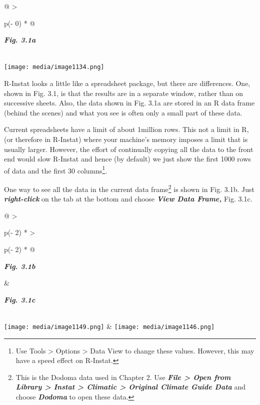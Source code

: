 \documentclass[
  letterpaper,
  DIV=11,
  numbers=noendperiod]{scrreprt}
\begin{document}
\begin{longtable}[]{@{}
  >{\raggedright\arraybackslash}p{(\columnwidth - 0\tabcolsep) * }@{}}
\toprule\noalign{}
\begin{minipage}[b]{\linewidth}\raggedright
\textbf{\emph{Fig. 3.1a}}
\end{minipage} \\
\midrule\noalign{}
\endhead
\bottomrule\noalign{}
\endlastfoot
\texttt{[image: media/image1134.png]} \\
\end{longtable}

R-Instat looks a little like a spreadsheet package, but there are
differences. One, shown in Fig. 3.1, is that the results are in a
separate window, rather than on successive sheets. Also, the data shown
in Fig. 3.1a are stored in an R data frame (behind the scenes) and what
you see is often only a small part of these data.

Current spreadsheets have a limit of about 1million rows. This not a
limit in R, (or therefore in R-Instat) where your machine's memory
imposes a limit that is usually larger. However, the effort of
continually copying all the data to the front end would slow R-Instat
and hence (by default) we just show the first 1000 rows of data and the
first 30 columns\footnote{Use Tools \textgreater{} Options
  \textgreater{} Data View to change these values. However, this may
  have a speed effect on R-Instat.}.

One way to see all the data in the current data frame\footnote{This is
  the Dodoma data used in Chapter 2. Use \textbf{\emph{File
  \textgreater{} Open from Library \textgreater{} Instat \textgreater{}
  Climatic \textgreater{} Original Climate Guide Data}} and choose
  \textbf{\emph{Dodoma}} to open these data.} is shown in Fig. 3.1b.
Just \textbf{\emph{right-click}} on the tab at the bottom and choose
\textbf{\emph{View Data Frame,}} Fig. 3.1c.

\begin{longtable}[]{@{}
  >{\raggedright\arraybackslash}p{(\columnwidth - 2\tabcolsep) * }
  >{\raggedright\arraybackslash}p{(\columnwidth - 2\tabcolsep) * }@{}}
\toprule\noalign{}
\begin{minipage}[b]{\linewidth}\raggedright
\textbf{\emph{Fig. 3.1b}}
\end{minipage} & \begin{minipage}[b]{\linewidth}\raggedright
\textbf{\emph{Fig. 3.1c}}
\end{minipage} \\
\midrule\noalign{}
\endhead
\bottomrule\noalign{}
\endlastfoot
\texttt{[image: media/image1149.png]}
&
\texttt{[image: media/image1146.png]} \\
\end{longtable}
\end{document}
